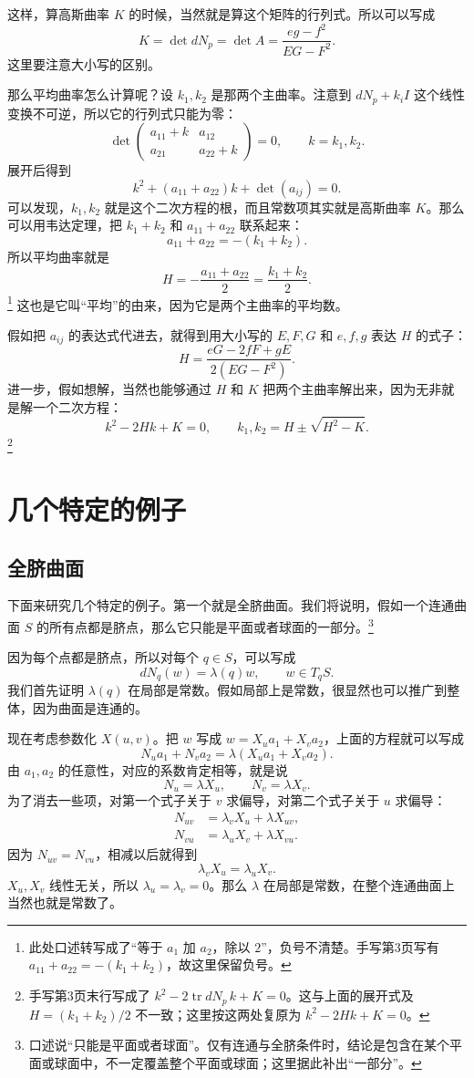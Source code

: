 \documentclass[UTF8,11pt,a4paper]{ctexart}
\begin{document}
这样，算高斯曲率 $K$ 的时候，当然就是算这个矩阵的行列式。所以可以写成
\[
K=\det dN_p=\det A=\frac{eg-f^2}{EG-F^2}.
\]
这里要注意大小写的区别。

那么平均曲率怎么计算呢？设 $k_1,k_2$ 是那两个主曲率。注意到 $dN_p+k_iI$ 这个线性变换不可逆，所以它的行列式只能为零：
\[
\det\begin{pmatrix}
a_{11}+k&a_{12}\\a_{21}&a_{22}+k
\end{pmatrix}=0,\qquad k=k_1,k_2.
\]
展开后得到
\[
k^2+(a_{11}+a_{22})k+\det(a_{ij})=0.
\]
可以发现，$k_1,k_2$ 就是这个二次方程的根，而且常数项其实就是高斯曲率 $K$。那么可以用韦达定理，把 $k_1+k_2$ 和 $a_{11}+a_{22}$ 联系起来：
\[
a_{11}+a_{22}=-(k_1+k_2).
\]
所以平均曲率就是
\[
H=-\frac{a_{11}+a_{22}}2=\frac{k_1+k_2}2.
\]\footnote{此处口述转写成了“等于 $a_1$ 加 $a_2$，除以 $2$”，负号不清楚。手写第3页写有 $a_{11}+a_{22}=-(k_1+k_2)$，故这里保留负号。}
这也是它叫“平均”的由来，因为它是两个主曲率的平均数。

假如把 $a_{ij}$ 的表达式代进去，就得到用大小写的 $E,F,G$ 和 $e,f,g$ 表达 $H$ 的式子：
\[
H=\frac{eG-2fF+gE}{2(EG-F^2)}.
\]
进一步，假如想解，当然也能够通过 $H$ 和 $K$ 把两个主曲率解出来，因为无非就是解一个二次方程：
\[
k^2-2Hk+K=0,\qquad
k_1,k_2=H\pm\sqrt{H^2-K}.
\]\footnote{手写第3页末行写成了 $k^2-2\operatorname{tr}dN_p\,k+K=0$。这与上面的展开式及 $H=(k_1+k_2)/2$ 不一致；这里按这两处复原为 $k^2-2Hk+K=0$。}

\section{几个特定的例子}

\subsection{全脐曲面}

下面来研究几个特定的例子。第一个就是全脐曲面。我们将说明，假如一个连通曲面 $S$ 的所有点都是脐点，那么它只能是平面或者球面的一部分。\footnote{口述说“只能是平面或者球面”。仅有连通与全脐条件时，结论是包含在某个平面或球面中，不一定覆盖整个平面或球面；这里据此补出“一部分”。}

因为每个点都是脐点，所以对每个 $q\in S$，可以写成
\[
dN_q(w)=\lambda(q)w,\qquad w\in T_qS.
\]
我们首先证明 $\lambda(q)$ 在局部是常数。假如局部上是常数，很显然也可以推广到整体，因为曲面是连通的。

现在考虑参数化 $X(u,v)$。把 $w$ 写成 $w=X_u a_1+X_v a_2$，上面的方程就可以写成
\[
N_u a_1+N_v a_2=\lambda(X_u a_1+X_v a_2).
\]
由 $a_1,a_2$ 的任意性，对应的系数肯定相等，就是说
\[
N_u=\lambda X_u,\qquad N_v=\lambda X_v.
\]
为了消去一些项，对第一个式子关于 $v$ 求偏导，对第二个式子关于 $u$ 求偏导：
\[
\begin{aligned}
N_{uv}&=\lambda_vX_u+\lambda X_{uv},\\
N_{vu}&=\lambda_uX_v+\lambda X_{vu}.
\end{aligned}
\]
因为 $N_{uv}=N_{vu}$，相减以后就得到
\[
\lambda_vX_u=\lambda_uX_v.
\]
$X_u,X_v$ 线性无关，所以 $\lambda_u=\lambda_v=0$。那么 $\lambda$ 在局部是常数，在整个连通曲面上当然也就是常数了。
\end{document}
